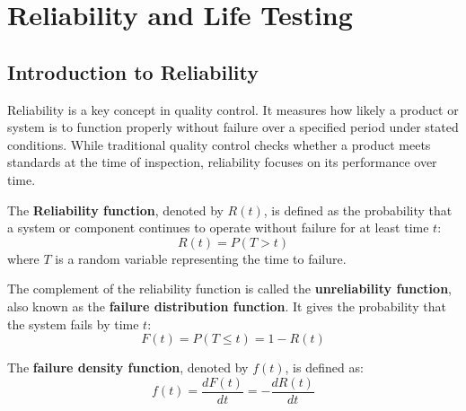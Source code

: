 \documentclass[twoside]{book}
\begin{document}



\section{Reliability and Life Testing}

\subsection{Introduction to Reliability}

Reliability is a key concept in quality control. It measures how likely a product or system is to function properly without failure over a specified period under stated conditions. While traditional quality control checks whether a product meets standards at the time of inspection, reliability focuses on its performance over time.

\begin{textbox}
The \textbf{Reliability function}, denoted by $R(t)$, is defined as the probability that a system or component continues to operate without failure for at least time $t$:
\begin{equation*}
R(t) = P(T > t)
\end{equation*}
where $T$ is a random variable representing the time to failure.
\end{textbox}

\medskip

The complement of the reliability function is called the \textbf{unreliability function}, also known as the \textbf{failure distribution function}. It gives the probability that the system fails by time $t$:
\begin{equation*}
F(t) = P(T \leq t) = 1 - R(t)
\end{equation*}

The \textbf{failure density function}, denoted by $f(t)$, is defined as:
\begin{equation*}
f(t) = \frac{dF(t)}{dt} = -\frac{dR(t)}{dt}
\end{equation*}
\end{document}
